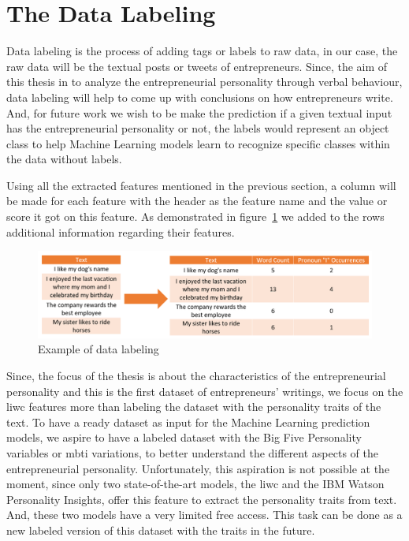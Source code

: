 \section{The Data Labeling}
Data labeling is the process of adding tags or labels to raw data, in our case, the raw data will be the textual posts or tweets of entrepreneurs. Since, the aim of this thesis in to analyze the entrepreneurial personality through verbal behaviour, data labeling will help to come up with conclusions on how entrepreneurs write. And, for future work we wish to be make the prediction if a given textual input has the entrepreneurial personality or not, the labels would represent an object class to help Machine Learning models learn to recognize specific classes within the data without labels.

Using all the extracted features mentioned in the previous section, a column will be made for each feature with the header as the feature name and the value or score it got on this feature. As demonstrated in figure~\ref{fig:labeling} we added to the rows additional information regarding their features.


\begin{figure}[H]
\centering
\includegraphics[width=15cm]{labeling}
\caption{Example of data labeling}
\label{fig:labeling}
\end{figure}

Since, the focus of the thesis is about the characteristics of the entrepreneurial personality and this is the first dataset of entrepreneurs' writings, we focus on the \ac{liwc} features more than labeling the dataset with the personality traits of the text. To have a ready dataset as input for the Machine Learning prediction models, we aspire to have a labeled dataset with the Big Five Personality variables or \ac{mbti} variations, to better understand the different aspects of the entrepreneurial personality. Unfortunately, this aspiration is not possible at the moment, since only two state-of-the-art models, the \ac{liwc} and the IBM Watson Personality Insights, offer this feature to extract the personality traits from text. And, these two models have a very limited free access. This task can be done as a new labeled version of this dataset with the traits in the future.

